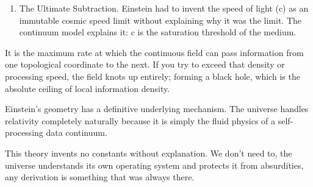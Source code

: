 \begin{enumerate}
\item The Ultimate Subtraction. Einstein had to invent the speed of light (c) as an immutable cosmic speed limit without explaining why it was the limit. The continuum model explains it: c is the saturation threshold of the medium.
\end{enumerate}

It is the maximum rate at which the continuous field can pass information from one topological coordinate to the next. If you try to exceed that density or processing speed, the field knots up entirely; forming a black hole, which is the absolute ceiling of local information density.

Einstein's geometry has a definitive underlying mechanism. The universe handles relativity completely naturally because it is simply the fluid physics of a self-processing data continuum.

This theory invents no constants without explanation. We don't need to, the universe understands its own operating system and protects it from absurdities, any derivation is something that was always there.

